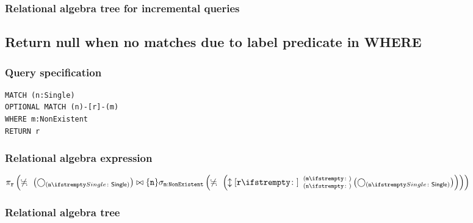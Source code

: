 \subsubsection*{Relational algebra tree for incremental queries}


\subsection{Return null when no matches due to label predicate in WHERE}

\subsubsection*{Query specification}

\begin{lstlisting}
MATCH (n:Single)
OPTIONAL MATCH (n)-[r]-(m)
WHERE m:NonExistent
RETURN r
\end{lstlisting}

\subsubsection*{Relational algebra expression}

$\projection{\var{r}} \left(\alldifferent{} \left(\getvertices{n}{Single}\right) \join \{\var{n}\} \selection{\mathtt{m:NonExistent}} \left(\alldifferent{} \left(\expandboth{r}{}{n}{m}{} \left(\getvertices{n}{Single}\right)\right)\right)\right)$

\subsubsection*{Relational algebra tree}

